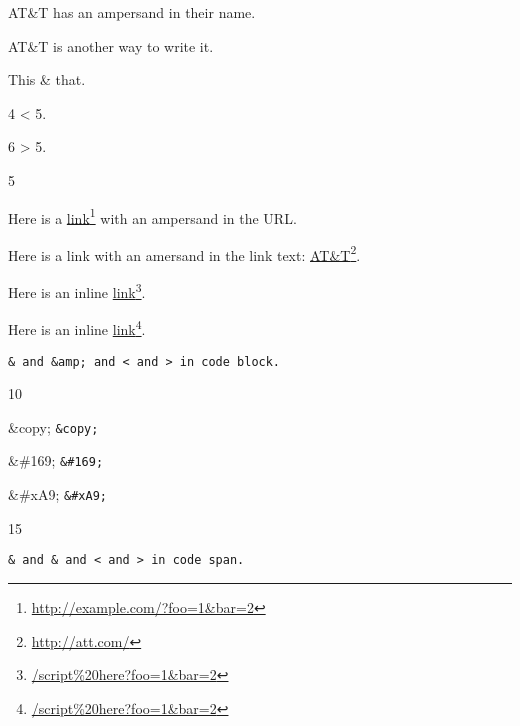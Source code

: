
\def\mytitle{Amps and Angles}


AT\&T has an ampersand in their name.

AT\&T is another way to write it.

This \& that.

4 < 5.

6 > 5.

5

Here is a \href{http://example.com/?foo=1&bar=2}{link}\footnote{\href{http://example.com/?foo=1&bar=2}{http:\slash \slash example.com\slash ?foo=1\&bar=2}} with an ampersand in the URL.

Here is a link with an amersand in the link text: \href{http://att.com/}{AT\&T}\footnote{\href{http://att.com/}{http:\slash \slash att.com\slash }}.

Here is an inline \href{/script%20here?foo=1&bar=2}{link}\footnote{\href{/script%20here?foo=1&bar=2}{\slash script\%20here?foo=1\&bar=2}}.

Here is an inline \href{/script%20here?foo=1&bar=2}{link}\footnote{\href{/script%20here?foo=1&bar=2}{\slash script\%20here?foo=1\&bar=2}}.

\begin{verbatim}
& and &amp; and < and > in code block.
\end{verbatim}

10

\&copy; \texttt{\&copy;}

\&\#169; \texttt{\&\#169;}

\&\#xA9; \texttt{\&\#xA9;}

15

\texttt{\& and \& and < and > in code span.}



